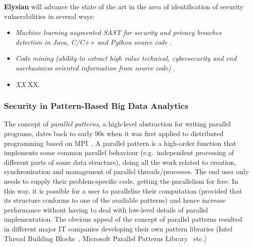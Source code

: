 \documentclass[a4paper,11pt]{article}
\newcommand{\project}[1]{\textbf{#1}\xspace}
\newcommand{\SECURITY}{\project{Elysian}}
\newcommand{\TheProject}{\SECURITY}
\begin{document}
\begin{mdframed}[backgroundcolor=gray!10]
\TheProject{} will advance the state of the art in the area of identification of security vulnerabilities in several ways:
\begin{itemize}
\item \emph{Machine learning augmented SAST for security and privacy breaches detection in Java, C/C++ and Python source code} .
\item \emph{Code mining (ability to extract high value technical, cybersecurity and end userbusiness oriented information from source code) } .
\item \emph{XX} XX.
\end{itemize}
\end{mdframed}

\subsubsection{Security in Pattern-Based Big Data Analytics}
\label{sect:patterns}

The concept of \emph{parallel patterns}, a high-level abstraction for writing parallel programs, dates back to early 90s when it was first applied to distributed programming based on MPI~\cite{cole89skeletons}. A parallel pattern is a high-order function that implements some common parallel behaviour (e.g.~independent processing of different parts of some data structure), doing all the work related to creation, synchronisation and management of parallel threads/processes. The end user only needs to supply their problem-specific code, getting the parallelism for free. In this way, it is possible for a user to parallelise their computation (provided that its structure conforms to one of the available patterns) and hence increase performance without having to deal with low-level details of parallel implementation. The obvious appeal of the concept of parallel patterns resulted in different major IT companies developing their own pattern libraries (Intel Thread Building Blocks~\cite{tbb}, Microsoft Parallel Patterns Library~\cite{ppl} etc.)

\end{document}

